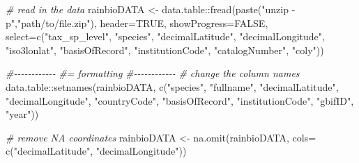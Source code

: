 \documentclass[
]{article}
\newenvironment{Shaded}{\begin{snugshade}}{\end{snugshade}}
\newcommand{\AttributeTok}[1]{\textcolor[rgb]{0.77,0.63,0.00}{#1}}
\newcommand{\CommentTok}[1]{\textcolor[rgb]{0.56,0.35,0.01}{\textit{#1}}}
\newcommand{\ConstantTok}[1]{\textcolor[rgb]{0.00,0.00,0.00}{#1}}
\newcommand{\FunctionTok}[1]{\textcolor[rgb]{0.00,0.00,0.00}{#1}}
\newcommand{\NormalTok}[1]{#1}
\newcommand{\OtherTok}[1]{\textcolor[rgb]{0.56,0.35,0.01}{#1}}
\newcommand{\SpecialCharTok}[1]{\textcolor[rgb]{0.00,0.00,0.00}{#1}}
\newcommand{\StringTok}[1]{\textcolor[rgb]{0.31,0.60,0.02}{#1}}
\begin{document}
\begin{Shaded}
\begin{Highlighting}[]

\CommentTok{\# read in the data}
\NormalTok{rainbioDATA }\OtherTok{\textless{}{-}}\NormalTok{ data.table}\SpecialCharTok{::}\FunctionTok{fread}\NormalTok{(}\FunctionTok{paste}\NormalTok{(}\StringTok{"unzip {-}p"}\NormalTok{,}\StringTok{"path/to/file.zip"}\NormalTok{),}
                                     \AttributeTok{header=}\ConstantTok{TRUE}\NormalTok{,}
                                     \AttributeTok{showProgress=}\ConstantTok{FALSE}\NormalTok{,}
                                     \AttributeTok{select=}\FunctionTok{c}\NormalTok{(}\StringTok{"tax\_sp\_level"}\NormalTok{,}
                                      \StringTok{"species"}\NormalTok{,}
                                      \StringTok{"decimalLatitude"}\NormalTok{,}
                                      \StringTok{"decimalLongitude"}\NormalTok{,}
                                      \StringTok{"iso3lonlat"}\NormalTok{,}
                                      \StringTok{"basisOfRecord"}\NormalTok{,}
                                      \StringTok{"institutionCode"}\NormalTok{,}
                                      \StringTok{"catalogNumber"}\NormalTok{,}
                                      \StringTok{"coly"}\NormalTok{))}

\CommentTok{\#{-}{-}{-}{-}{-}{-}{-}{-}{-}{-}{-}{-}}
\CommentTok{\#= formatting}
\CommentTok{\#{-}{-}{-}{-}{-}{-}{-}{-}{-}{-}{-}{-}}
\CommentTok{\# change the column names}
\NormalTok{data.table}\SpecialCharTok{::}\FunctionTok{setnames}\NormalTok{(rainbioDATA, }
                     \FunctionTok{c}\NormalTok{(}\StringTok{"species"}\NormalTok{,}
                       \StringTok{"fullname"}\NormalTok{,}
                       \StringTok{"decimalLatitude"}\NormalTok{,}
                       \StringTok{"decimalLongitude"}\NormalTok{,}
                       \StringTok{"countryCode"}\NormalTok{,}
                       \StringTok{"basisOfRecord"}\NormalTok{,}
                       \StringTok{"institutionCode"}\NormalTok{,}
                       \StringTok{"gbifID"}\NormalTok{,}
                       \StringTok{"year"}\NormalTok{))}

\CommentTok{\# remove NA coordinates}
\NormalTok{rainbioDATA }\OtherTok{\textless{}{-}} \FunctionTok{na.omit}\NormalTok{(rainbioDATA, }\AttributeTok{cols=} \FunctionTok{c}\NormalTok{(}\StringTok{"decimalLatitude"}\NormalTok{, }\StringTok{"decimalLongitude"}\NormalTok{))}


\end{Highlighting}
\end{Shaded}
\end{document}
